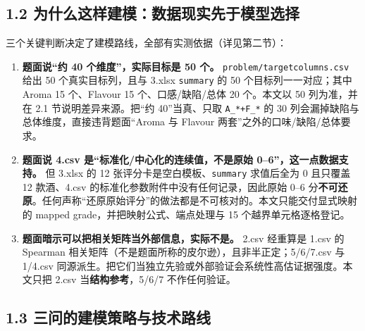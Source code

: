 \documentclass[
  11pt,
]{ctexart}
\providecommand{\tightlist}{%
  \setlength{\itemsep}{0pt}\setlength{\parskip}{0pt}}
\begin{document}
\subsection{1.2
为什么这样建模：数据现实先于模型选择}\label{ux4e3aux4ec0ux4e48ux8fd9ux6837ux5efaux6a21ux6570ux636eux73b0ux5b9eux5148ux4e8eux6a21ux578bux9009ux62e9}

三个关键判断决定了建模路线，全部有实测依据（详见第二节）：

\begin{enumerate}
\def\labelenumi{\arabic{enumi}.}
\tightlist
\item
  \textbf{题面说``约 40 个维度''，实际目标是 50 个。}
  \texttt{problem/\allowbreak{}targetcolumns.\allowbreak{}csv} 给出 50 个真实目标列，且与 3.xlsx
  \texttt{summary} 的 50 个目标列一一对应；其中 Aroma 15 个、Flavour 15
  个、口感/缺陷/总体 20 个。本文以 50 列为准，并在 2.1
  节说明差异来源。把``约 40''当真、只取 \texttt{A\_*+F\_*} 的 30
  列会漏掉缺陷与总体维度，直接违背题面``Aroma 与 Flavour
  两套''之外的口味/缺陷/总体要求。
\item
  \textbf{题面说 4.csv 是``标准化/中心化的连续值，不是原始
  0--6''，这一点数据支持。} 但 3.xlsx 的 12
  张评分卡是空白模板、\texttt{summary} 求值后全为 0 且只覆盖 12
  款酒、4.csv 的标准化参数附件中没有任何记录，因此原始 0--6
  分\textbf{不可还原}。任何声称``还原原始评分''的做法都是不可核对的。本文只能交付显式映射的
  mapped grade，并把映射公式、端点处理与 15 个越界单元格逐格登记。
\item
  \textbf{题面暗示可以把相关矩阵当外部信息，实际不是。} 2.csv 经重算是
  1.csv 的 Spearman
  相关矩阵（不是题面所称的皮尔逊），且非半正定；5/6/7.csv 与 1/4.csv
  同源派生。把它们当独立先验或外部验证会系统性高估证据强度。本文只把
  2.csv 当\textbf{结构参考}，5/6/7 不作任何验证。
\end{enumerate}

\subsection{1.3
三问的建模策略与技术路线}\label{ux4e09ux95eeux7684ux5efaux6a21ux7b56ux7565ux4e0eux6280ux672fux8defux7ebf}
\end{document}
